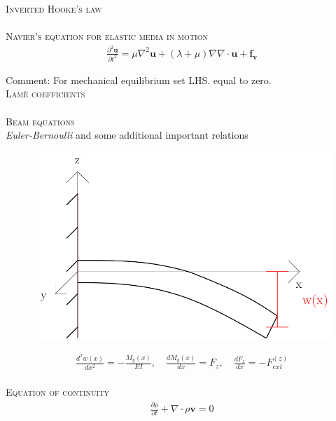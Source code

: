 \documentclass[11pt,a4paper,english]{article}
\begin{document}
{\scshape Inverted Hooke's law} \\
\\[2ex]

{\scshape Navier's equation for elastic media in motion} \\
\begin{align*}
\frac{\partial^2 \mathbf{u}}{\partial t^2} = \mu \nabla^2 \mathbf{u} + (\lambda + \mu) \nabla \nabla \cdot \mathbf{u} + \mathbf{f_v}
\end{align*}

Comment: For mechanical equilibrium set LHS. equal to zero. 
\\[2ex]

{\scshape Lamè coefficients} \\
\\[2ex]

{\scshape Beam equations} \\

\emph{Euler-Bernoulli} and some additional important relations

\begin{figure}[h!]
\centering
\includegraphics[scale=0.15]{figures/beam.png}
\end{figure}


\begin{align*}
\frac{d^2 w(x)}{dx^2} = - \frac{M_y (x)}{EI}, \quad \frac{dM_y(x)}{dx} = F_z, \quad \frac{dF_z}{dx} = - F_{ext}^{(z)} 
\end{align*}
\\[2ex]

{\scshape Equation of continuity} \\
\begin{align*}
\frac{\partial \rho}{\partial t} + \nabla \cdot  \rho \mathbf{v} = 0
\end{align*}
\\[2ex]
\end{document}
